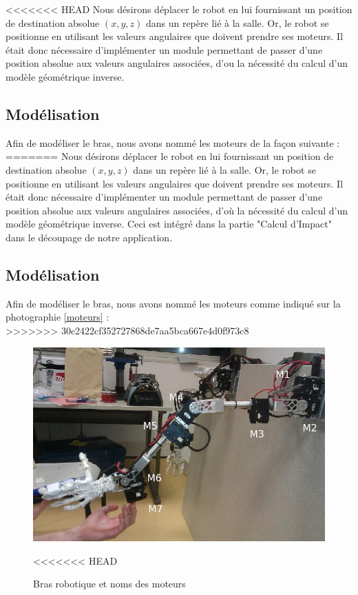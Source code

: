 <<<<<<< HEAD
Nous désirons déplacer le robot en lui fournissant un position de destination absolue $(x, y, z)$ dans un repère lié à la salle. Or, le robot se positionne en utilisant les valeurs angulaires que doivent prendre ses moteurs. Il était donc nécessaire d'implémenter un module permettant de passer d'une position absolue aux valeurs angulaires associées, d'ou la nécessité du calcul d'un modèle géométrique inverse.

\subsection{Modélisation}

Afin de modéliser le bras, nous avons nommé les moteurs de la façon suivante :\\
=======
Nous désirons déplacer le robot en lui fournissant un position de destination absolue $(x, y, z)$ dans un repère lié à la salle. Or, le robot se positionne en utilisant les valeurs angulaires que doivent prendre ses moteurs. Il était donc nécessaire d'implémenter un module permettant de passer d'une position absolue aux valeurs angulaires associées, d'où la nécessité du calcul d'un modèle géométrique inverse. Ceci est intégré dans la partie "Calcul d'Impact" dans le découpage de notre application.

\subsection{Modélisation}

Afin de modéliser le bras, nous avons nommé les moteurs comme indiqué sur la photographie \ref{moteurs} :\\
>>>>>>> 30c2422cf352727868de7aa5bca667e4d0f973c8

\begin{figure}[!htc]
	\begin{center}
		\includegraphics[scale=0.6]{images/robot1.jpg}
		\caption{Bras robotique et noms des moteurs} 
<<<<<<< HEAD
		\label{general}
	\end{center}
\end{figure}

